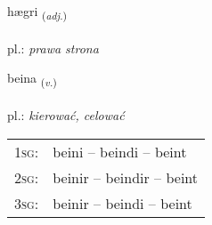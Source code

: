 \documentclass[frontgrid, backgrid]{flacards}\usepackage[]{graphicx}\usepackage[]{xcolor}
\begin{document}
\renewcommand{\flhead}{\vskip5pt \fboxsep=0pt {\small\bfseries\footnotesize Lýsingarorð | Adjective}}
\renewcommand{\fcfoot}{\vskip5pt \fboxsep=0pt \hspace{2pt}{\small\bfseries\footnotesize 2K}}

\renewcommand{\blhead}{\vskip5pt {\small\bfseries\footnotesize Lýsingarorð | Adjective }}
\renewcommand{\bcfoot}{\vskip5pt \hspace{2pt}{\small\bfseries\footnotesize 2K}}


{hægri \small{\textsubscript{(\textit{adj.})}} \\[1ex] %
\textphonetic{[haiɣrɪ]} \\
pl.: \emph{prawa strona} \\  [2ex]
\renewcommand*{\arraystretch}{0.8}
}

\renewcommand{\flhead}{\vskip5pt \fboxsep=0pt {\small\bfseries\footnotesize Sagnorð | Verb}}
\renewcommand{\fcfoot}{\vskip5pt \fboxsep=0pt \hspace{2pt}{\small\bfseries\footnotesize 2K}}

\renewcommand{\blhead}{\vskip5pt {\small\bfseries\footnotesize Sagnorð | Verb }}
\renewcommand{\bcfoot}{\vskip5pt \hspace{2pt}{\small\bfseries\footnotesize 2K}}


{beina \small{\textsubscript{(\textit{v.})}} \\[1ex] %
\textphonetic{[peiːna]} \\
pl.: \emph{kierować, celować} \\  [2ex]
\renewcommand*{\arraystretch}{0.8}
\begin{tabular}{p{1cm}l}
\textsc{1sg}: & beini -- beindi -- beint \\ 
\textsc{2sg}: & beinir -- beindir -- beint \\ 
\textsc{3sg}: & beinir -- beindi -- beint \\ 
\end{tabular}
}
\end{document}
